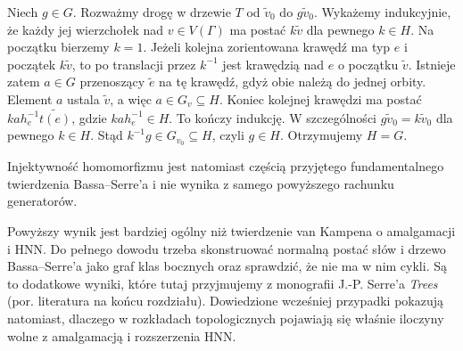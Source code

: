 \begin{uwaga}
Niech $g\in G$. Rozważmy drogę w drzewie $T$
od $\widetilde v_0$ do $g\widetilde v_0$.
Wykażemy indukcyjnie, że każdy jej wierzchołek
nad $v\in V(\Gamma)$ ma postać $k\widetilde v$
dla pewnego $k\in H$. Na początku bierzemy $k=1$.
Jeżeli kolejna zorientowana krawędź ma typ $e$
i początek $k\widetilde v$, to po translacji
przez $k^{-1}$ jest krawędzią nad $e$
o początku $\widetilde v$.
Istnieje zatem $a\in G$ przenoszący
$\widetilde e$ na tę krawędź, gdyż obie
należą do jednej orbity. Element $a$ ustala
$\widetilde v$, a więc $a\in G_v\subseteq H$.
Koniec kolejnej krawędzi ma postać
$ka h_e^{-1}\widetilde{t(e)}$, gdzie
$ka h_e^{-1}\in H$. To kończy indukcję.
W szczególności $g\widetilde v_0=k\widetilde v_0$
dla pewnego $k\in H$. Stąd
$k^{-1}g\in G_{v_0}\subseteq H$, czyli $g\in H$.
Otrzymujemy $H=G$.

Injektywność homomorfizmu jest natomiast częścią
przyjętego fundamentalnego twierdzenia
Bassa--Serre'a i nie wynika z samego powyższego
rachunku generatorów.
\end{uwaga}

\begin{uwaga}
Powyższy wynik jest bardziej ogólny niż twierdzenie van
Kampena o amalgamacji i HNN. Do pełnego dowodu trzeba
skonstruować normalną postać słów i drzewo Bassa--Serre'a
jako graf klas bocznych oraz sprawdzić, że nie ma w nim
cykli. Są to dodatkowe wyniki, które tutaj przyjmujemy
z monografii J.-P. Serre'a \emph{Trees}
(por. literatura na końcu rozdziału).
Dowiedzione wcześniej przypadki pokazują natomiast,
dlaczego w rozkładach topologicznych pojawiają się właśnie
iloczyny wolne z amalgamacją i rozszerzenia HNN.
\end{uwaga}

